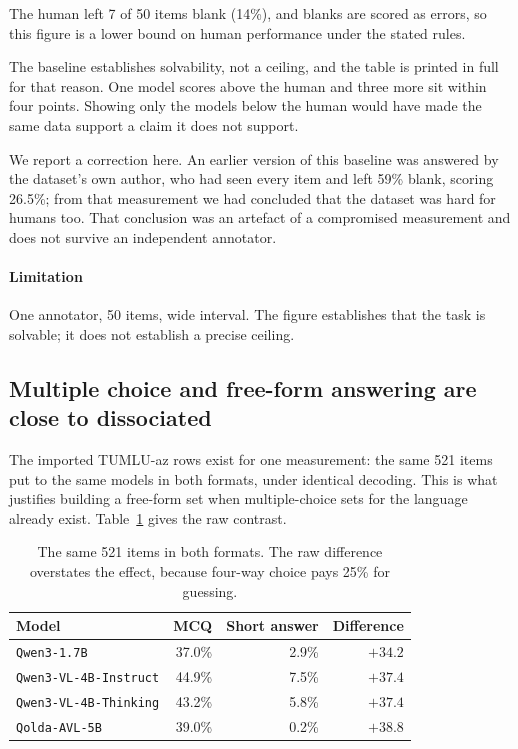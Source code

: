 \documentclass[final]{clv2025}
\begin{document}
The human left 7 of 50 items blank (14\%), and blanks are scored as errors, so
this figure is a lower bound on human performance under the stated rules.

The baseline establishes solvability, not a ceiling, and the table is printed
in full for that reason. One model scores above the human and three more sit
within four points. Showing only the models below the human would have made the
same data support a claim it does not support.

We report a correction here. An earlier version of this baseline was answered
by the dataset's own author, who had seen every item and left 59\% blank,
scoring 26.5\%; from that measurement we had concluded that the dataset was
hard for humans too. That conclusion was an artefact of a compromised
measurement and does not survive an independent annotator.

\paragraph{Limitation} One annotator, 50 items, wide interval. The figure
establishes that the task is solvable; it does not establish a precise ceiling.

\subsection{Multiple choice and free-form answering are close to dissociated}

The imported TUMLU-az rows exist for one measurement: the same 521 items put to
the same models in both formats, under identical decoding. This is what
justifies building a free-form set when multiple-choice sets for the language
already exist. Table~\ref{tab:format} gives the raw contrast.

\begin{table}[h!]
\caption{The same 521 items in both formats. The raw difference overstates the
effect, because four-way choice pays 25\% for guessing.}
\label{tab:format}
\centering
\begin{tabular}{lrrr}
\toprule
Model & MCQ & Short answer & Difference \\
\midrule
\texttt{Qwen3-1.7B} & 37.0\% & 2.9\% & $+34.2$ \\
\texttt{Qwen3-VL-4B-Instruct} & 44.9\% & 7.5\% & $+37.4$ \\
\texttt{Qwen3-VL-4B-Thinking} & 43.2\% & 5.8\% & $+37.4$ \\
\texttt{Qolda-AVL-5B} & 39.0\% & 0.2\% & $+38.8$ \\
\bottomrule
\end{tabular}
\end{table}
\end{document}
